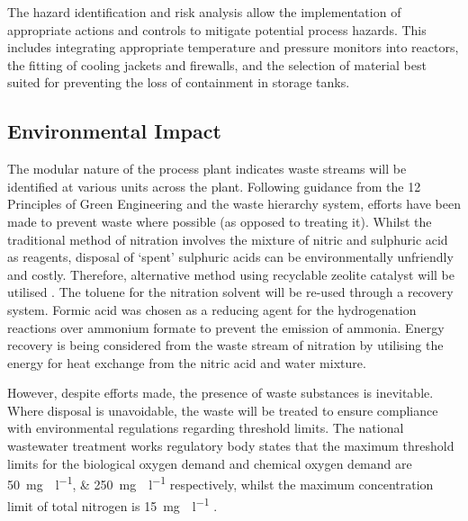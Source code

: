 The hazard identification and risk analysis allow the implementation of appropriate actions and controls to mitigate potential process hazards. This includes integrating appropriate temperature and pressure monitors into reactors, the fitting of cooling jackets and firewalls, and the selection of material best suited for preventing the loss of containment in storage tanks.


\subsection{Environmental Impact}

The modular nature of the process plant indicates waste streams will be identified at various units across the plant. Following guidance from the 12 Principles of Green Engineering and the waste hierarchy system, efforts have been made to prevent waste where possible (as opposed to treating it). Whilst the traditional method of nitration involves the mixture of nitric and sulphuric acid as reagents, disposal of ‘spent’ sulphuric acids can be environmentally unfriendly and costly. Therefore, alternative method using recyclable zeolite catalyst will be utilised  \cite{smith_superior_1996}. The toluene for the nitration solvent will be re-used through a recovery system. Formic acid was chosen as a reducing agent for the hydrogenation reactions over ammonium formate to prevent the emission of  ammonia. Energy recovery is being considered from the waste stream of nitration by utilising the energy for heat exchange from the nitric acid and water mixture. 

However, despite efforts made, the presence of waste substances is inevitable. Where disposal is unavoidable, the waste will be treated to ensure compliance with environmental regulations regarding threshold limits. The national wastewater treatment works regulatory body states that the maximum threshold limits for the biological oxygen demand and chemical oxygen demand are \SIlist{50;250}{\mg{}\per\l} respectively, whilst the maximum concentration limit of total nitrogen is \SI{15}{\mg{}\per\l} \cite{noauthor_waste_nodate}.